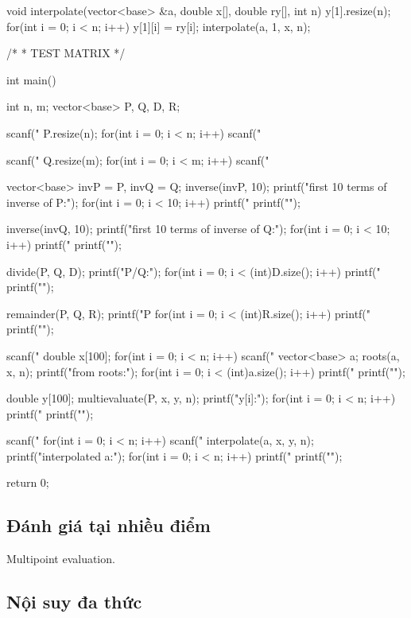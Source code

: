 \documentclass[11pt]{article}
\begin{document}
\begin{vncode}
void interpolate(vector<base> &a, double x[], double ry[], int n) {
	y[1].resize(n);
	for(int i = 0; i < n; i++) y[1][i] = ry[i];
	interpolate(a, 1, x, n);
}

/*
 * TEST MATRIX
 */

int main() {
	int n, m;
	vector<base> P, Q, D, R;
	
	scanf("%
	P.resize(n);
	for(int i = 0; i < n; i++) scanf("%
	
	scanf("%
	Q.resize(m);
	for(int i = 0; i < m; i++) scanf("%

	vector<base> invP = P, invQ = Q;
	inverse(invP, 10);
	printf("first 10 terms of inverse of P:");
	for(int i = 0; i < 10; i++) printf(" %
	printf("\n");
	
	inverse(invQ, 10);
	printf("first 10 terms of inverse of Q:");
	for(int i = 0; i < 10; i++) printf(" %
	printf("\n");

	divide(P, Q, D);
	printf("P/Q:");
	for(int i = 0; i < (int)D.size(); i++) printf(" %
	printf("\n");
	
	remainder(P, Q, R);
	printf("P%
	for(int i = 0; i < (int)R.size(); i++) printf(" %
	printf("\n");

	scanf("%
	double x[100];
	for(int i = 0; i < n; i++) scanf("%
	vector<base> a;
	roots(a, x, n);
	printf("from roots:");
	for(int i = 0; i < (int)a.size(); i++) printf(" %
	printf("\n");

	double y[100];
	multievaluate(P, x, y, n);
	printf("y[i]:");
	for(int i = 0; i < n; i++) printf(" %
	printf("\n");

	scanf("%
	for(int i = 0; i < n; i++) scanf("%
	interpolate(a, x, y, n);
	printf("interpolated a:");
	for(int i = 0; i < n; i++) printf(" %
	printf("\n");

	return 0;
}
\end{vncode}
\endgroup


\subsection{Đánh giá tại nhiều điểm}

Multipoint evaluation.

\subsection{Nội suy đa thức}
\end{document}
